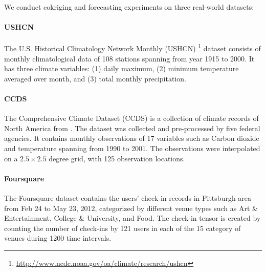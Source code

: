 We conduct cokriging and forecasting experiments on three real-world datasets: 
\vspace{-3mm}
\paragraph{USHCN}
The U.S. Historical  Climatology Network Monthly (USHCN) \footnote{\url{ http://www.ncdc.noaa.gov/oa/climate/research/ushcn}} dataset consists of monthly climatological data of 108 stations spanning from year 1915 to 2000. It has three climate variables: (1) daily maximum, (2) minimum temperature  averaged over month, and (3) total monthly precipitation. 
\vspace{-3mm}
\paragraph{CCDS}
The Comprehensive Climate Dataset (CCDS) is a collection of climate records of North America from \cite{lozano2009spatial}. The dataset was collected and pre-processed by five federal agencies. %
It contains monthly observations of 17 variables such as Carbon dioxide and temperature spanning from 1990 to 2001. The observations were interpolated on a $2.5 \times 2.5$ degree grid, with 125 observation locations.
\vspace{-3mm}
\paragraph{Foursquare}
The Foursquare dataset \cite{long2012exploring} contains the users' check-in records in Pittsburgh area from Feb 24 to May 23, 2012, categorized by different venue types such as Art \& Entertainment, College \& University, and Food. The check-in tensor is created by counting the number of check-ins by 121 users  in each of the 15 category of venues during 1200 time intervals.

